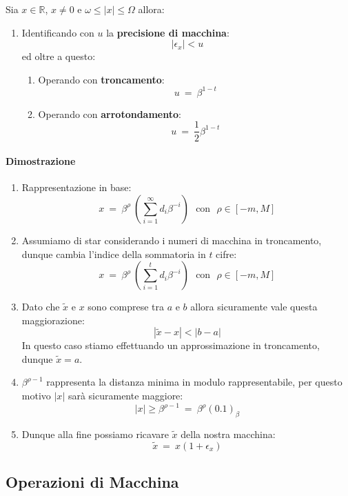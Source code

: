 \documentclass{article}
\begin{document}
Sia $x \in \mathbb{R}$, $x \neq 0$ e $\omega \leq |x| \leq \Omega$ allora:

\begin{enumerate}
    \item Identificando con $u$ la \textbf{precisione di macchina}:
    \[ |\epsilon_{x}| < u \]
    ed oltre a questo:
    \begin{enumerate}
        \item Operando con \textbf{troncamento}:
        \[ u \: = \: \beta^{1-t} \]
        \item Operando con \textbf{arrotondamento}:
        \[ u \: = \: \frac{1}{2}\beta^{1-t} \]
    \end{enumerate}
\end{enumerate}

\newpage

\paragraph{Dimostrazione}

\begin{enumerate}
    \item Rappresentazione in base: 
    \[ x \: = \: \beta^{\rho} \: (\sum^{\infty}_{i=1} d_{i}\beta^{-i}) \:\:\: \text{con} \:\:\: \rho \in [-m,M] \]
    \item Assumiamo di star considerando i numeri di macchina in troncamento, dunque cambia l'indice della sommatoria in $t$ cifre:
    \[ x \: = \: \beta^{\rho} \: (\sum^{t}_{i=1} d_{i}\beta^{-i}) \:\:\: \text{con} \:\:\: \rho \in [-m,M] \]
    \item Dato che $\tilde{x}$ e $x$ sono comprese tra $a$ e $b$ allora sicuramente vale questa maggiorazione:
    \[ |\tilde{x} - x| < |b-a| \]
    In questo caso stiamo effettuando un approssimazione in troncamento, dunque $\tilde{x} = a$.
    \item $\beta^{\rho-1}$ rappresenta la distanza minima in modulo rappresentabile, per questo motivo $|x|$ sarà sicuramente maggiore:
    \[ |x| \geq \beta^{\rho-1} \: = \: \beta^{\rho}(0.1)_{\beta} \]
    \item Dunque alla fine possiamo ricavare $\tilde{x}$ della nostra macchina:
    \[ \boxed{\tilde{x} \: = \: x(1+\epsilon_{x})} \]
\end{enumerate}

\newpage

\subsection{Operazioni di Macchina}
\end{document}
